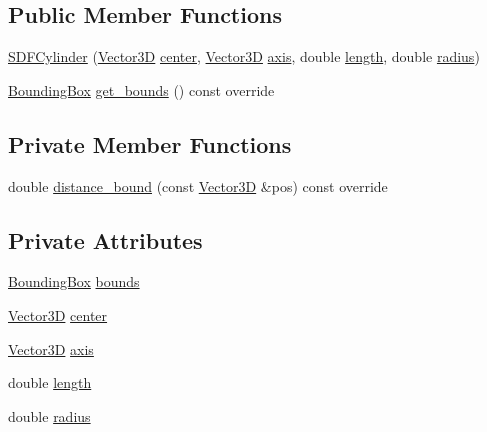 \subsection*{Public Member Functions}
\begin{DoxyCompactItemize}
\item 
\mbox{\hyperlink{classSDFCylinder_a696d9dfb42e436d07c7777c45c1c973e}{S\+D\+F\+Cylinder}} (\mbox{\hyperlink{classVector3D}{Vector3D}} \mbox{\hyperlink{classSDFCylinder_a9191a358a55f4b1dd9257e0664c531ff}{center}}, \mbox{\hyperlink{classVector3D}{Vector3D}} \mbox{\hyperlink{classSDFCylinder_a0120c881204422391fd52fa5215512ab}{axis}}, double \mbox{\hyperlink{classSDFCylinder_aae02d54259ddf572cd2b87c427dc1b08}{length}}, double \mbox{\hyperlink{classSDFCylinder_a63b1f14e28187305347485d3083f4c9b}{radius}})
\item 
\mbox{\hyperlink{classBoundingBox}{Bounding\+Box}} \mbox{\hyperlink{classSDFCylinder_a45fafcbf4f71ed9b45d7ab09579c734c}{get\+\_\+bounds}} () const override
\end{DoxyCompactItemize}
\subsection*{Private Member Functions}
\begin{DoxyCompactItemize}
\item 
double \mbox{\hyperlink{classSDFCylinder_a20732b488b83720390197e50ead3883a}{distance\+\_\+bound}} (const \mbox{\hyperlink{classVector3D}{Vector3D}} \&pos) const override
\end{DoxyCompactItemize}
\subsection*{Private Attributes}
\begin{DoxyCompactItemize}
\item 
\mbox{\hyperlink{classBoundingBox}{Bounding\+Box}} \mbox{\hyperlink{classSDFCylinder_a4a25bf70750daa3248c900e7f1bb8b5f}{bounds}}
\item 
\mbox{\hyperlink{classVector3D}{Vector3D}} \mbox{\hyperlink{classSDFCylinder_a9191a358a55f4b1dd9257e0664c531ff}{center}}
\item 
\mbox{\hyperlink{classVector3D}{Vector3D}} \mbox{\hyperlink{classSDFCylinder_a0120c881204422391fd52fa5215512ab}{axis}}
\item 
double \mbox{\hyperlink{classSDFCylinder_aae02d54259ddf572cd2b87c427dc1b08}{length}}
\item 
double \mbox{\hyperlink{classSDFCylinder_a63b1f14e28187305347485d3083f4c9b}{radius}}
\end{DoxyCompactItemize}


